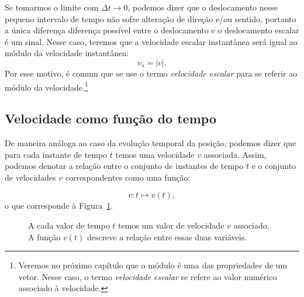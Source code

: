 Se tomarmos o limite com $\Delta t \to 0$, podemos dizer que o deslocamento nesse pequeno intervalo de tempo não sofre alteração de direção e/ou sentido, portanto a única diferença diferença possível entre o deslocamento e o deslocamento escalar é um sinal. Nesse caso, teremos que a velocidade escalar instantânea será igual ao módulo da velocidade instantânea:
\begin{equation}
  v_s = |v|.
\end{equation}
%
Por esse motivo, é comum que se use o termo \emph{velocidade escalar} para se referir ao módulo da velocidade.\footnote{Veremos no próximo capítulo que o módulo é uma das propriedades de um vetor. Nesse caso, o termo \emph{velocidade escalar} se refere ao valor numérico associado à velocidade.}

\subsection{Velocidade como função do tempo}

De maneira análoga ao caso da evolução temporal da posição, podemos dizer que para cada instante de tempo $t$ temos uma velocidade $v$ associada. Assim, podemos denotar a relação entre o conjunto de instantes de tempo $t$ e o conjunto de velocidades $v$ correspondentes como uma função:

\begin{equation}
    v: t \mapsto v(t),
\end{equation}
%
o que corresponde à Figura~\ref{Fig:GrafVelFuncTempoDiversasCurvas}.
\begin{figure}
\centering
{}
\caption{A cada valor de tempo $t$ temos um valor de velocidade $v$ associado. A função $v(t)$ descreve a relação entre essas duas variáveis.\label{Fig:GrafVelFuncTempoDiversasCurvas}}
\end{figure}

